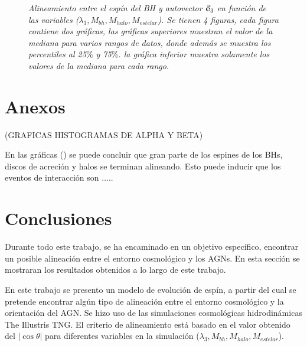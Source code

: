 \begin{figure}
\caption{\emph{Alineamiento entre el espín del BH y autovector $\vec{\bf{e}}_3$ en función de las variables ($\lambda_{3}, M_{bh}, M_{halo}, M_{estelar}$). Se tienen 4 figuras, cada figura contiene dos gráficas, las gráficas superiores muestran el valor de la mediana para varios rangos de datos, donde además se muestra los percentiles al 25$\%$ y 75$\%$. la gráfica inferior muestra solamente los valores de la mediana para cada rango.} }
\label{fig: median dispercion} 
\end{figure}


\newpage
\section{Anexos}
\label{sec: anexos}
(GRAFICAS HISTOGRAMAS DE ALPHA Y BETA)

En las gráficas () se puede concluir que gran parte de los espines de los BHs, discos de acreción y halos se terminan alineando. Esto puede inducir que los eventos de interacción son .....




\newpage
\section{Conclusiones}
\label{sec: conclusiones}
Durante todo este trabajo, se ha encaminado en un objetivo específico, encontrar un posible alineación entre el entorno cosmológico y los AGNs. En esta sección se mostraran los resultados obtenidos a lo largo de este trabajo.


En este trabajo se presento un modelo de evolución de espín, a partir del cual se pretende encontrar algún tipo de alineación entre el entorno cosmológico y la orientación del AGN. Se hizo uso de las simulaciones cosmológicas hidrodinámicas The Illustris TNG. El criterio de alineamiento está basado en el valor obtenido del $|\cos \theta|$ para diferentes variables en la simulación ($\lambda_{3}, M_{bh}, M_{halo}, M_{estelar}$). 

